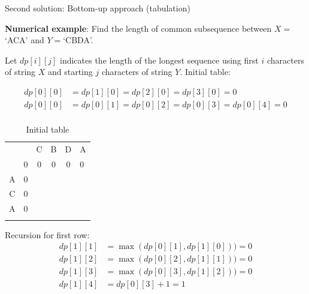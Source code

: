 \documentclass[a4paper,11pt]{book}
\begin{document}
\noindent Second solution: Bottom-up approach (tabulation)

\noindent \textbf{Numerical example}: Find the length of common subsequence between $X=$`ACA' and $Y=$`CBDA'.

\vspace{3mm}

\noindent Let $dp[i][j]$ indicates the length of the longest sequence using first $i$ characters of string $X$ and starting $j$ characters of string $Y$. Initial table:

\begin{align*}
    dp[0][0] &= dp[1][0] = dp[2][0] = dp[3][0] = 0\\
    dp[0][0] &= dp[0][1] = dp[0][2] = dp[0][3] = dp[0][4] = 0\\
\end{align*}
\begin{table}[ht]
\centering
\begin{tabular}{cccccl}
                       &                        & C                      & B                      & D                      & A                      \\ \cline{2-6} 
\multicolumn{1}{c|}{}  & \multicolumn{1}{c|}{0} & \multicolumn{1}{c|}{0} & \multicolumn{1}{c|}{0} & \multicolumn{1}{c|}{0} & \multicolumn{1}{l|}{0} \\ \cline{2-6} 
\multicolumn{1}{c|}{A} & \multicolumn{1}{c|}{0} & \multicolumn{1}{c|}{}  & \multicolumn{1}{c|}{}  & \multicolumn{1}{c|}{}  & \multicolumn{1}{l|}{}  \\ \cline{2-6} 
\multicolumn{1}{c|}{C} & \multicolumn{1}{c|}{0} & \multicolumn{1}{c|}{}  & \multicolumn{1}{c|}{}  & \multicolumn{1}{c|}{}  & \multicolumn{1}{l|}{}  \\ \cline{2-6} 
\multicolumn{1}{c|}{A} & \multicolumn{1}{c|}{0} & \multicolumn{1}{c|}{}  & \multicolumn{1}{c|}{}  & \multicolumn{1}{c|}{}  & \multicolumn{1}{l|}{}  \\ \cline{2-6} 
\multicolumn{1}{l}{}   & \multicolumn{1}{l}{}   & \multicolumn{1}{l}{}   & \multicolumn{1}{l}{}   & \multicolumn{1}{l}{}   &                       
\end{tabular}
\caption{Initial table}
\end{table}

\noindent Recursion for first row:
\begin{align*}
    dp[1][1] &= \max(dp[0][1], dp[1][0])) = 0\\
    dp[1][2] &= \max(dp[0][2], dp[1][1])) = 0\\
    dp[1][3] &= \max(dp[0][3], dp[1][2])) = 0\\
    dp[1][4] &= dp[0][3] + 1 = 1
\end{align*}
\end{document}
